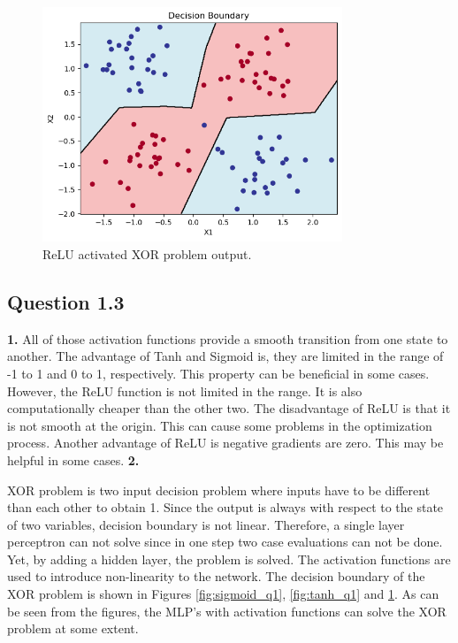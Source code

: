 \documentclass{assignment}
\begin{document}
\begin{figure}[htbp!]
    \centering
    \includegraphics[width=0.8\textwidth]{figures/q1_relu.png}
    \caption{ReLU activated XOR problem output.}
    \label{fig:relu_q1}
\end{figure}

\subsection{Question 1.3}
\textbf{1.}
All of those activation functions provide a smooth transition from one state to another. The advantage of Tanh and Sigmoid is, they are limited in the range of -1 to 1 and 0 to 1, respectively. This property can be beneficial in some cases. However, the ReLU function is not limited in the range. It is also computationally cheaper than the other two. The disadvantage of ReLU is that it is not smooth at the origin. This can cause some problems in the optimization process. Another advantage of ReLU is negative gradients are zero. This may be helpful in some cases. 
\textbf{2.}

XOR problem is two input decision problem where inputs have to be different than each other to obtain 1. Since the output is always with respect to the state of two variables, decision boundary is not linear. Therefore, a single layer perceptron can not solve since in one step two case evaluations can not be done. Yet, by adding a hidden layer, the problem is solved. The activation functions are used to introduce non-linearity to the network. The decision boundary of the XOR problem is shown in Figures \ref{fig:sigmoid_q1}, \ref{fig:tanh_q1} and \ref{fig:relu_q1}. As can be seen from the figures, the MLP's with activation functions can solve the XOR problem at some extent.
\end{document}
